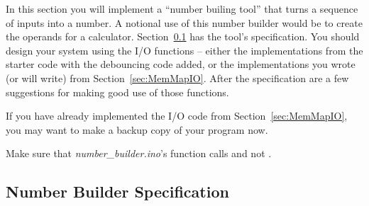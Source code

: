 In this section you will implement a ``number builing tool'' that turns a sequence of inputs into a number.
A notional use of this number builder would be to create the operands for a calculator.
Section~\ref{sec:FunctionalSpecification} has the tool's specification.
You should design your system using the I/O functions -- either the implementations from the starter code with the debouncing code added, or the implementations you wrote (or will write) from Section~\ref{sec:MemMapIO}.
After the specification are a few suggestions for making good use of those functions.

If you have already implemented the I/O code from Section~\ref{sec:MemMapIO}, you may want to make a backup copy of your program now.

Make sure that \textit{number\_builder.ino}'s  function calls  and not .


\subsection{Number Builder Specification} \label{sec:FunctionalSpecification}

